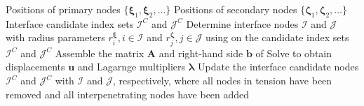 \begin{algorithmic}[1]
    \Require Positions of primary nodes $\{\boldsymbol{\xi}_1, \boldsymbol{\xi}_2, \dots\}$
    \Require Positions of secondary nodes $\{\boldsymbol{\zeta}_1, \boldsymbol{\zeta}_2, \dots\}$
    \Require Interface candidate index sets $\mathcal{I}^C$ and $\mathcal{J}^C$
        \State Determine interface nodes $\mathcal{I}$ and $\mathcal{J}$ with radius parameters $r^{\boldsymbol{\xi}}_i, i \in \mathcal{I}$
        and $r^{\boldsymbol{\zeta}}_j, j \in \mathcal{J}$  using  on the candidate index sets $\mathcal{I}^C$ and $\mathcal{J}^C$
        \State Assemble the matrix $\mathbf{A}$ and right-hand side $\mathbf{b}$ of 
        \State Solve  to obtain displacements $\mathbf{u}$ and Lagarnge multipliers $\boldsymbol{\lambda}$
        \State Update the interface candidate nodes $\mathcal{I}^C$ and $\mathcal{J}^C$ with
        $\mathcal{I}$ and $\mathcal{J}$, respectively, where all nodes in tension
        have been removed and all interpenetrating nodes have been added 
    \EndWhile
\end{algorithmic}